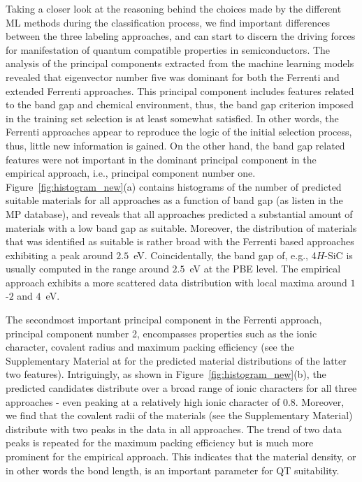 \documentclass[superscriptaddress,unsortedaddress,
 amsmath,amssymb,
 aps,
]{revtex4-2}
\begin{document}
Taking a closer look at the reasoning behind the choices made by the different ML methods during the classification process, we find important differences between the three labeling approaches, and can start to discern the driving forces for manifestation of quantum compatible properties in semiconductors. 
The analysis of the principal components extracted from the machine learning models revealed that eigenvector number five was dominant for both the Ferrenti and extended Ferrenti approaches. This principal component includes features related to the band gap and chemical environment, thus, the band gap criterion imposed in the training set selection is at least somewhat satisfied. 
In other words, the Ferrenti approaches appear to reproduce the logic of the initial selection process, thus, little new information is gained. 
On the other hand, the band gap related features were not important in the dominant principal component in the empirical approach, i.e., principal component number one.  
Figure~\ref{fig:histogram_new}(a) contains histograms of the number of predicted suitable materials for all approaches as a function of  band gap (as listen in the MP database), and reveals that all approaches predicted a substantial amount of materials with a low band gap as suitable. Moreover, the distribution of materials that was identified as suitable is rather broad with the Ferrenti based approaches exhibiting a peak around $2.5$~eV. 
Coincidentally, the band gap of, e.g., 4$H$-SiC is usually computed in the range around $2.5$~eV at the PBE level. 
The empirical approach exhibits a more scattered data distribution with local maxima around $1$-$2$ and $4$~eV. 

The secondmost important principal component in the Ferrenti approach, principal component number 2, encompasses properties such as the ionic character, covalent radius and maximum packing efficiency (see the Supplementary Material at \cite{supplementary} for the predicted material distributions of the latter two features).  
Intriguingly, as shown in Figure~\ref{fig:histogram_new}(b), the predicted candidates distribute over a broad range of ionic characters  for all three approaches - even peaking at a relatively high ionic character of $0.8$. 
Moreover, we find that the covalent radii of the materials (see the Supplementary Material) distribute with two peaks in the data in all approaches. 
The trend of two data peaks is repeated for the maximum packing efficiency  but is much more prominent for the empirical approach. This indicates that the material density, or in other words the bond length, is an important parameter for QT suitability.  
\end{document}
